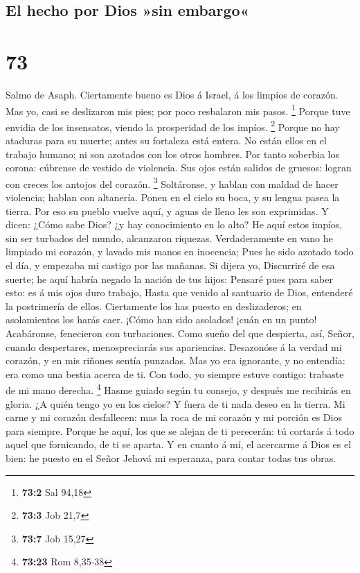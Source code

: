 \hypertarget{el-hecho-por-dios-sin-embargo}{%
\subsection{El hecho por Dios »sin
embargo«}\label{el-hecho-por-dios-sin-embargo}}

\hypertarget{section-72}{%
\section{73}\label{section-72}}

 Salmo de Asaph. Ciertamente bueno es Dios á Israel, á los
limpios de corazón.  Mas yo, casi se deslizaron mis pies;
por poco resbalaron mis pasos. \footnote{\textbf{73:2} Sal 94,18}
 Porque tuve envidia de los insensatos, viendo la
prosperidad de los impíos. \footnote{\textbf{73:3} Job 21,7}
 Porque no hay ataduras para su muerte; antes su fortaleza
está entera.  No están ellos en el trabajo humano; ni son
azotados con los otros hombres.  Por tanto soberbia los
corona: cúbrense de vestido de violencia.  Sus ojos están
salidos de gruesos: logran con creces los antojos del corazón.
\footnote{\textbf{73:7} Job 15,27}  Soltáronse, y hablan con
maldad de hacer violencia; hablan con altanería.  Ponen en
el cielo su boca, y su lengua pasea la tierra.  Por eso su
pueblo vuelve aquí, y aguas de lleno les son exprimidas.  Y
dicen: ¿Cómo sabe Dios? ¿y hay conocimiento en lo alto?  He
aquí estos impíos, sin ser turbados del mundo, alcanzaron riquezas.
 Verdaderamente en vano he limpiado mi corazón, y lavado
mis manos en inocencia;  Pues he sido azotado todo el día,
y empezaba mi castigo por las mañanas.  Si dijera yo,
Discurriré de esa suerte; he aquí habría negado la nación de tus hijos:
 Pensaré pues para saber esto: es á mis ojos duro trabajo,
 Hasta que venido al santuario de Dios, entenderé la
postrimería de ellos.  Ciertamente los has puesto en
deslizaderos; en asolamientos los harás caer.  ¡Cómo han
sido asolados! ¡cuán en un punto! Acabáronse, fenecieron con
turbaciones.  Como sueño del que despierta, así, Señor,
cuando despertares, menospreciarás sus apariencias. 
Desazonóse á la verdad mi corazón, y en mis riñones sentía punzadas.
 Mas yo era ignorante, y no entendía: era como una bestia
acerca de ti.  Con todo, yo siempre estuve contigo:
trabaste de mi mano derecha. \footnote{\textbf{73:23} Rom 8,35-38}
 Hasme guiado según tu consejo, y después me recibirás en
gloria.  ¿A quién tengo yo en los cielos? Y fuera de ti
nada deseo en la tierra.  Mi carne y mi corazón
desfallecen: mas la roca de mi corazón y mi porción es Dios para
siempre.  Porque he aquí, los que se alejan de ti
perecerán: tú cortarás á todo aquel que fornicando, de ti se aparta.
 Y en cuanto á mí, el acercarme á Dios es el bien: he
puesto en el Señor Jehová mi esperanza, para contar todas tus obras.


